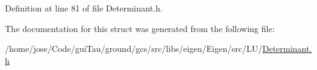 Definition at line 81 of file Determinant.\-h.



The documentation for this struct was generated from the following file\-:\begin{DoxyCompactItemize}
\item 
/home/jose/\-Code/gui\-Tau/ground/gcs/src/libs/eigen/\-Eigen/src/\-L\-U/\hyperlink{_determinant_8h}{Determinant.\-h}\end{DoxyCompactItemize}
